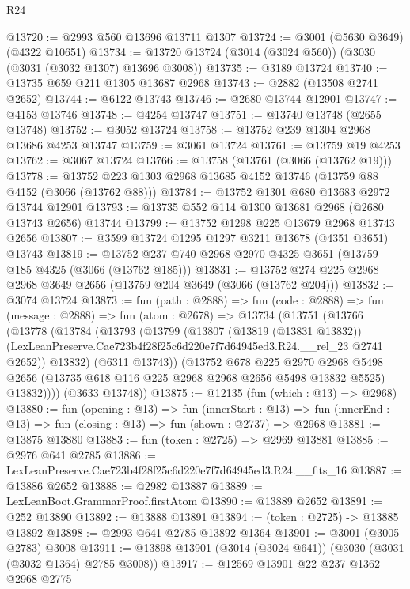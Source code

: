 \begin{lexlean}{R24}
\begin{coremodule}
@13720 := @2993 @560 @13696 @13711 @1307
@13724 := @3001 (@5630 @3649) (@4322 @10651)
@13734 := @13720 @13724 (@3014 (@3024 @560)) (@3030 (@3031 (@3032 @1307) @13696 @3008))
@13735 := @3189 @13724
@13740 := @13735 @659 @211 @1305 @13687 @2968
@13743 := @2882 (@13508 @2741 @2652)
@13744 := @6122 @13743
@13746 := @2680 @13744 @12901
@13747 := @4153 @13746
@13748 := @4254 @13747
@13751 := @13740 @13748 (@2655 @13748)
@13752 := @3052 @13724
@13758 := @13752 @239 @1304 @2968 @13686 @4253 @13747
@13759 := @3061 @13724
@13761 := @13759 @19 @4253
@13762 := @3067 @13724
@13766 := @13758 (@13761 (@3066 (@13762 @19)))
@13778 := @13752 @223 @1303 @2968 @13685 @4152 @13746 (@13759 @88 @4152 (@3066 (@13762 @88)))
@13784 := @13752 @1301 @680 @13683 @2972 @13744 @12901
@13793 := @13735 @552 @114 @1300 @13681 @2968 (@2680 @13743 @2656) @13744
@13799 := @13752 @1298 @225 @13679 @2968 @13743 @2656
@13807 := @3599 @13724 @1295 @1297 @3211 @13678 (@4351 @3651) @13743
@13819 := @13752 @237 @740 @2968 @2970 @4325 @3651 (@13759 @185 @4325 (@3066 (@13762 @185)))
@13831 := @13752 @274 @225 @2968 @2968 @3649 @2656 (@13759 @204 @3649 (@3066 (@13762 @204)))
@13832 := @3074 @13724
@13873 := fun (path : @2888) =>
  fun (code : @2888) =>
  fun (message : @2888) =>
  fun (atom : @2678) =>
  @13734
    (@13751
      (@13766
        (@13778
          (@13784
            (@13793
              (@13799
                (@13807
                  (@13819 (@13831 @13832))
                  (LexLeanPreserve.Cae723b4f28f25c6d220e7f7d64945ed3.R24.__rel_23 @2741 @2652))
                @13832)
              (@6311 @13743))
            (@13752
              @678
              @225
              @2970
              @2968
              @5498
              @2656
              (@13735 @618 @116 @225 @2968 @2968 @2656 @5498 @13832 @5525)
              @13832))))
      (@3633 @13748))
@13875 := @12135 (fun (which : @13) => @2968)
@13880 := fun (opening : @13) =>
  fun (innerStart : @13) =>
  fun (innerEnd : @13) => fun (closing : @13) => fun (shown : @2737) => @2968
@13881 := @13875 @13880
@13883 := fun (token : @2725) => @2969 @13881
@13885 := @2976 @641 @2785
@13886 := LexLeanPreserve.Cae723b4f28f25c6d220e7f7d64945ed3.R24.__fits_16
@13887 := @13886 @2652
@13888 := @2982 @13887
@13889 := LexLeanBoot.GrammarProof.firstAtom
@13890 := @13889 @2652
@13891 := @252 @13890
@13892 := @13888 @13891
@13894 := (token : @2725) -> @13885 @13892
@13898 := @2993 @641 @2785 @13892 @1364
@13901 := @3001 (@3005 @2783) @3008
@13911 := @13898 @13901 (@3014 (@3024 @641)) (@3030 (@3031 (@3032 @1364) @2785 @3008))
@13917 := @12569 @13901 @22 @237 @1362 @2968 @2775

\end{coremodule}
\end{lexlean}
